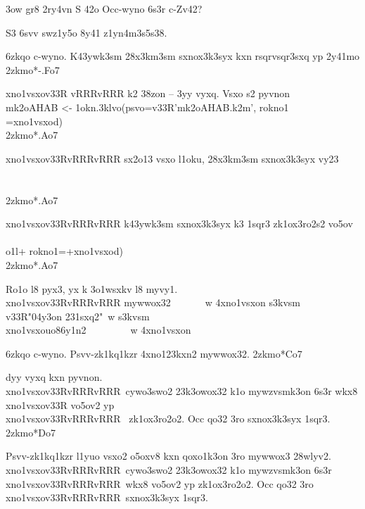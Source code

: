 \s3ow
gr8 2ry4vn S 42o Occ-wyno 6s3r c-Zv42?

S3 6svv swz1y5o 8y41 z1yn4m3s5s38.


\xo6zkqo
{\lp c-wyno.} K43ywk3sm 28x3km3sm sxnox3k3syx kxn rsqrvsqr3sxq yp 2y41mo
\52zkmo*{-.Fo7}

{
\4xno1vsxo{\2v33R \2vRRR\2vRRR k2 38zon -- 3yy vyxq.  Vsxo s2 pyvnon}\\
            { mk2oAHAB <- 1okn.3klvo(psvo={\2v33R'mk2oAHAB.k2m'}, rokno1\Lc} \\
            { =\4xno1vsxo{d})}\\
\52zkmo*{.Ao7}

\4xno1vsxo{\2v33R{\2vRRR\2vRRR sx2o13 vsxo l1oku, 28x3km3sm sxnox3k3syx vy23}}\\
             \\
             \\
\52zkmo*{.Ao7}

\4xno1vsxo{\2v33R{\2vRRR\2vRRR k43ywk3sm sxnox3k3syx k3 1sqr3 zk1ox3ro2s2 vo5ov}}\\
             \\
        \5o1l+                      rokno1=+\4xno1vsxo{d})\\
\52zkmo*{.Ao7}

Ro1o l8 pyx3, yx k 3o1wsxkv l8 myvy1.\\
\4xno1vsxo{\2v33R{\2vRRR\2vRRR mywwox32}}~~~~~~~{\1w 4xno1vsxon s3kvsm}\\
          {\2v33R"04y3on 231sxq2"}~{\1w s3kvsm}\\
\4xno1vsxo{uo86y1n2}~~~~~~~~~{\1w 4xno1vsxon}
}


\xo6zkqo
{\lp c-wyno.} Psvv-zk1kq1kzr 4xno123kxn2 mywwox32.
\52zkmo*{Co7}

dyy vyxq kxn pyvnon.\\
\4xno1vsxo{\2v33R\2vRRR\2vRRR~cywo3swo2 23k3owox32 k1o mywzvsmk3on 6s3r wkx8}\Lc\\
\4xno1vsxo{\2v33R vo5ov2 yp}\\
\4xno1vsxo{\2v33R\2vRRR\2vRRR~ zk1ox3ro2o2.  Occ qo32 3ro sxnox3k3syx 1sqr3.}
\52zkmo*{Do7}

Psvv-zk1kq1kzr l1yuo vsxo2 o5oxv8 kxn qoxo1k3on 3ro mywwox3 28wlyv2.\\
\4xno1vsxo{\2v33R\2vRRR\2vRRR~cywo3swo2 23k3owox32 k1o mywzvsmk3on 6s3r}\\
\4xno1vsxo{\2v33R\2vRRR\2vRRR~wkx8 vo5ov2 yp zk1ox3ro2o2.  Occ qo32 3ro}\\
\4xno1vsxo{\2v33R\2vRRR\2vRRR~sxnox3k3syx 1sqr3.}

